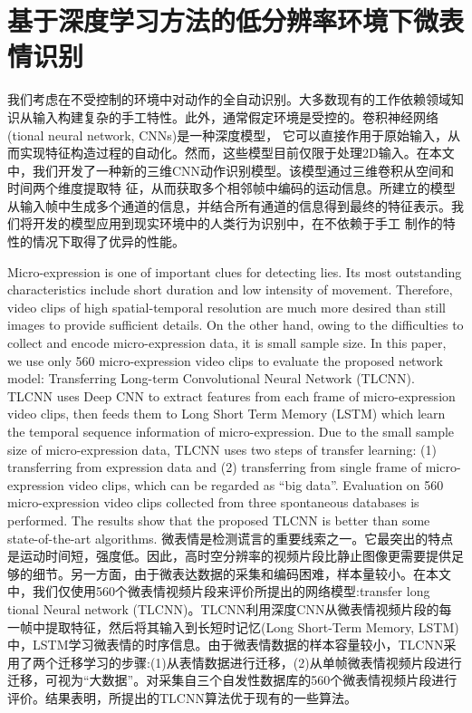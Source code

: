 \chapter{基于深度学习方法的低分辨率环境下微表情识别}\label{chap:owner2}

我们考虑在不受控制的环境中对动作的全自动识别。大多数现有的工作依赖领域知识从输入构建复杂的手工特性。此外，通常假定环境是受控的。卷积神经网络(tional neural network, CNNs)是一种深度模型，
它可以直接作用于原始输入，从而实现特征构造过程的自动化。然而，这些模型目前仅限于处理2D输入。在本文中，我们开发了一种新的三维CNN动作识别模型。该模型通过三维卷积从空间和时间两个维度提取特
征，从而获取多个相邻帧中编码的运动信息。所建立的模型从输入帧中生成多个通道的信息，并结合所有通道的信息得到最终的特征表示。我们将开发的模型应用到现实环境中的人类行为识别中，在不依赖于手工
制作的特性的情况下取得了优异的性能。

Micro-expression is one of important clues for detecting lies. Its most outstanding characteristics include short duration and low intensity of movement. Therefore, video clips of high spatial-temporal resolution are much more desired than still images to provide sufficient details. On the other hand, owing to the difficulties to collect and encode micro-expression data, it is small sample size. In this paper, we use only 560 micro-expression video clips to evaluate the proposed network model: Transferring Long-term Convolutional Neural Network (TLCNN). TLCNN uses Deep CNN to extract features from each frame of micro-expression video clips, then feeds them to Long Short Term Memory (LSTM) which learn the temporal sequence information of micro-expression. Due to the small sample size of micro-expression data, TLCNN uses two steps of transfer learning: (1) transferring from expression data and (2) transferring from single frame of micro-expression video clips, which can be regarded as “big data”. Evaluation on 560 micro-expression video clips collected from three spontaneous databases is performed. The results show that the proposed TLCNN is better than some state-of-the-art algorithms.
微表情是检测谎言的重要线索之一。它最突出的特点是运动时间短，强度低。因此，高时空分辨率的视频片段比静止图像更需要提供足够的细节。另一方面，由于微表达数据的采集和编码困难，样本量较小。在本文中，我们仅使用560个微表情视频片段来评价所提出的网络模型:transfer long tional Neural network (TLCNN)。TLCNN利用深度CNN从微表情视频片段的每一帧中提取特征，然后将其输入到长短时记忆(Long Short-Term Memory, LSTM)中，LSTM学习微表情的时序信息。由于微表情数据的样本容量较小，TLCNN采用了两个迁移学习的步骤:(1)从表情数据进行迁移，(2)从单帧微表情视频片段进行迁移，可视为“大数据”。对采集自三个自发性数据库的560个微表情视频片段进行评价。结果表明，所提出的TLCNN算法优于现有的一些算法。


